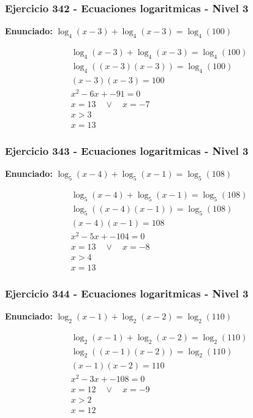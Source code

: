 \documentclass[12pt,a4paper]{article}
\begin{document}
\subsubsection*{Ejercicio 342 - Ecuaciones logaritmicas - Nivel 3}
\textbf{Enunciado:} \(\log_{4}\left(x-3\right)+\log_{4}\left(x-3\right)=\log_{4}\left(100\right)\)

\[
\begin{aligned}
\log_{4}\left(x-3\right)+\log_{4}\left(x-3\right)=\log_{4}\left(100\right)\\
\log_{4}\left((x-3)(x-3)\right)=\log_{4}\left(100\right)\\
(x-3)(x-3)=100\\
x^2-6x+-91=0\\
x=13\quad \vee\quad x=-7\\
x>3\\
\boxed{x=13}
\end{aligned}
\]


\subsubsection*{Ejercicio 343 - Ecuaciones logaritmicas - Nivel 3}
\textbf{Enunciado:} \(\log_{5}\left(x-4\right)+\log_{5}\left(x-1\right)=\log_{5}\left(108\right)\)

\[
\begin{aligned}
\log_{5}\left(x-4\right)+\log_{5}\left(x-1\right)=\log_{5}\left(108\right)\\
\log_{5}\left((x-4)(x-1)\right)=\log_{5}\left(108\right)\\
(x-4)(x-1)=108\\
x^2-5x+-104=0\\
x=13\quad \vee\quad x=-8\\
x>4\\
\boxed{x=13}
\end{aligned}
\]


\subsubsection*{Ejercicio 344 - Ecuaciones logaritmicas - Nivel 3}
\textbf{Enunciado:} \(\log_{2}\left(x-1\right)+\log_{2}\left(x-2\right)=\log_{2}\left(110\right)\)

\[
\begin{aligned}
\log_{2}\left(x-1\right)+\log_{2}\left(x-2\right)=\log_{2}\left(110\right)\\
\log_{2}\left((x-1)(x-2)\right)=\log_{2}\left(110\right)\\
(x-1)(x-2)=110\\
x^2-3x+-108=0\\
x=12\quad \vee\quad x=-9\\
x>2\\
\boxed{x=12}
\end{aligned}
\]
\end{document}
